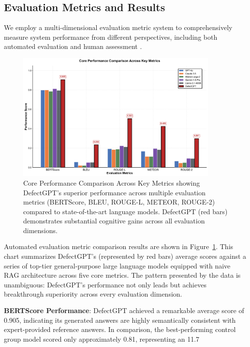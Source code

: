 \subsection{Evaluation Metrics and Results}

We employ a multi-dimensional evaluation metric system to comprehensively measure system performance from different perspectives, including both automated evaluation and human assessment \cite{hernandez2022measuring}.

\begin{figure}[htbp]
\centering
\includegraphics[width=0.9\textwidth]{figures/DefectGPT/performance comparison.png}
\caption{Core Performance Comparison Across Key Metrics showing DefectGPT's superior performance across multiple evaluation metrics (BERTScore, BLEU, ROUGE-L, METEOR, ROUGE-2) compared to state-of-the-art language models. DefectGPT (red bars) demonstrates substantial cognitive gains across all evaluation dimensions.}
\label{fig:performance-comparison}
\end{figure}

Automated evaluation metric comparison results are shown in Figure~\ref{fig:performance-comparison}. This chart summarizes DefectGPT's (represented by red bars) average scores against a series of top-tier general-purpose large language models equipped with naive RAG architecture across five core metrics. The pattern presented by the data is unambiguous: DefectGPT's performance not only leads but achieves breakthrough superiority across every evaluation dimension.

\textbf{BERTScore Performance}: DefectGPT achieved a remarkable average score of 0.905, indicating its generated answers are highly semantically consistent with expert-provided reference answers. In comparison, the best-performing control group model scored only approximately 0.81, representing an 11.7%

